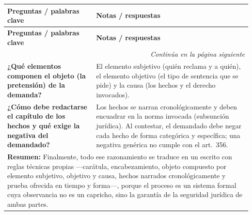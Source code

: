 \documentclass[12pt,oneside]{book}
\begin{document}
\begin{longtable}{
    p{}
    p{}
}
\toprule
\textbf{Preguntas / palabras clave} & \textbf{Notas / respuestas} \\
\midrule
\endfirsthead
\toprule
\textbf{Preguntas / palabras clave} & \textbf{Notas / respuestas} \\
\midrule
\endhead
\midrule
\multicolumn{2}{r}{\textit{Continúa en la página siguiente}} \\
\endfoot
\bottomrule
\endlastfoot

\textbf{¿Qué elementos componen el objeto (la pretensión) de la demanda?} &
El elemento subjetivo (quién reclama y a quién), el elemento objetivo (el tipo de sentencia que se pide) y la causa (los hechos y el derecho invocados). \\

\textbf{¿Cómo debe redactarse el capítulo de los hechos y qué exige la negativa del demandado?} &
Los hechos se narran cronológicamente y deben encuadrar en la norma invocada (subsunción jurídica). Al contestar, el demandado debe negar cada hecho de forma categórica y específica; una negativa genérica no cumple con el art.\ 356. \\

\midrule
\multicolumn{2}{p{\dimexpr\textwidth-2\tabcolsep\relax}}{
\textbf{Resumen:} Finalmente, todo ese razonamiento se traduce en un escrito con reglas técnicas propias —carátula, encabezamiento, objeto compuesto por elemento subjetivo, objetivo y causa, hechos narrados cronológicamente y prueba ofrecida en tiempo y forma—, porque el proceso es un sistema formal cuya observancia no es un capricho, sino la garantía de la seguridad jurídica de ambas partes.
} \\

\end{longtable}
\end{document}
